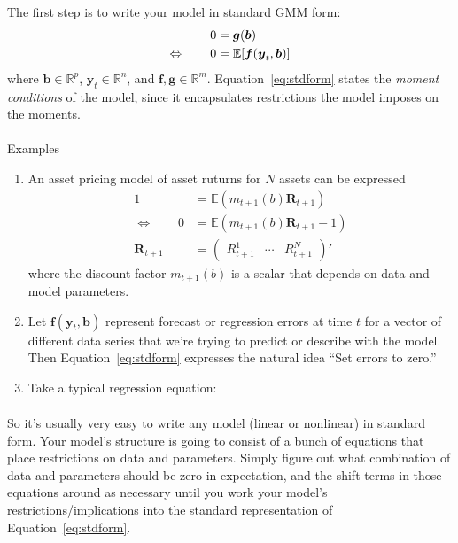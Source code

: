 \documentclass[12pt]{article}
\theoremstyle{plain}
\theoremstyle{definition}
\theoremstyle{remark}
\begin{document}
The first step is to write your model in standard GMM form:
\begin{align}
  0 &= \boldsymbol{g}(\boldsymbol{b})\label{eq:stdform}\\
  \Leftrightarrow\qquad
  0 &= \mathbb{E}[\boldsymbol{f}(\boldsymbol{y}_t,\boldsymbol{b})]
  \notag
\end{align}
where $\boldsymbol{b}\in\mathbb{R}^p$,
$\boldsymbol{y}_t\in\mathbb{R}^n$, and $\boldsymbol{f},
\boldsymbol{g}\in\mathbb{R}^m$.  Equation~\ref{eq:stdform} states the
\emph{moment conditions} of the model, since it encapsulates
restrictions the model imposes on the moments.
\\
\\
Examples
\begin{enumerate}
  \item An asset pricing model of asset ruturns for $N$ assets can be
    expressed
    \begin{align*}
      1 &= \mathbb{E}(m_{t+1}(b) \boldsymbol{R}_{t+1}) \\
      \Leftrightarrow \qquad
      0 &= \mathbb{E}(m_{t+1}(b) \boldsymbol{R}_{t+1}-1)\\
      \boldsymbol{R}_{t+1} &=
      \begin{pmatrix}
        R^1_{t+1}
        &\cdots&
        R^N_{t+1}
      \end{pmatrix}'
    \end{align*}
    where the discount factor $m_{t+1}(b)$ is a scalar that depends on
    data and model parameters.
  \item Let $\boldsymbol{f}(\boldsymbol{y}_t,\boldsymbol{b})$ represent
    forecast or regression errors at time $t$ for a vector of different
    data series that we're trying to predict or describe with the model.
    Then Equation~\ref{eq:stdform} expresses the natural idea ``Set
    errors to zero.''
  \item Take a typical regression equation:
    \begin{align*}
    \end{align*}
\end{enumerate}
So it's usually very easy to write any model (linear or nonlinear) in
standard form. Your model's structure is going to consist of a bunch of
equations that place restrictions on data and parameters.  Simply figure
out what combination of data and parameters should be zero in
expectation, and the shift terms in those equations around as necessary
until you work your model's restrictions/implications into the standard
representation of Equation~\ref{eq:stdform}.
\end{document}

